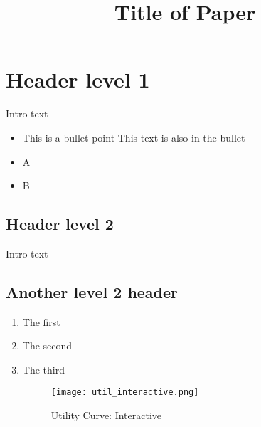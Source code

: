 \documentclass[10pt]{article}
\begin{document}
\title{Title of Paper}

\section{Header level 1}
Intro text

\begin{itemize}
    \item This is a bullet point
          This text is also in the bullet
        
    \item A
    
    \item B
    
\end{itemize}

\subsection{Header level 2}
Intro text


\subsection{Another level 2 header}

\begin{enumerate}
    \item The first
    \item The second
    \item The third
    \begin{figure}[h] %
        \centering %
        \texttt{[image: util\_interactive.png]} %
        \caption{Utility Curve: Interactive} %
        \label{fig:u2} %
    \end{figure}
\end{enumerate}
\end{document}
